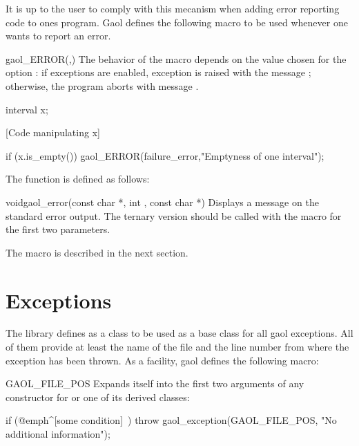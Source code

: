\documentclass{manual}
\begin{document}
It is up to the user to comply with this mecanism when adding error reporting
code to ones program. Gaol defines the following macro to be used
whenever one wants to report an error.

\begin{defmacroA}{gaol\_ERROR}{(,)}
  The behavior of the macro depends on the value chosen for the option
  : if exceptions are enabled, exception
   is raised with the message ; otherwise, the
  program aborts with message .

\begin{example}
interval x;

[Code manipulating x]

if (x.is_empty()) {
   gaol_ERROR(failure_error,"Emptyness of one interval");
}
\end{example}
\end{defmacroA}

The  function is defined as follows:

\begin{deffun}{void}{gaol\_error}{(const char *, int ,
const char *)}
Displays a message on the standard error output. The ternary version should be
called with the  macro for the first two parameters.
\end{deffun}

The  macro is described in the next section.

\section{Exceptions}\label{sec:exceptions}

The library defines  as a class to be used as a base
class for all gaol exceptions.
All of them provide at least the name of the file and the line number from
where the exception has been thrown. As a facility, gaol defines the following
macro:

\begin{defmacro}{GAOL\_FILE\_POS}
Expands itself into the first two arguments of any constructor for
 or one of its derived classes:

\begin{example}
if (@emph^[some condition]~) {
  throw gaol_exception(GAOL_FILE_POS,
                       "No additional information");
}
\end{example}
\end{defmacro}
\end{document}
